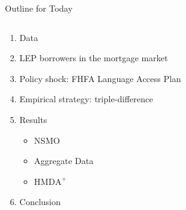 \documentclass[aspectratio=169,11pt]{beamer}
\begin{document}
\begin{frame}{Outline for Today}
\begin{columns}[T] %
\begin{column}{.65\textwidth}
    \begin{enumerate}
        \item Data
        \item LEP borrowers in the mortgage market
        \item Policy shock: FHFA Language Access Plan
        \item Empirical strategy: triple-difference
        \item Results
        \begin{itemize}
            \item NSMO
            \item Aggregate Data
            \item $\text{HMDA}^+$
        \end{itemize}
        \item Conclusion
    \end{enumerate}
\end{column}
\begin{column}{.35\textwidth}
\end{column}
\end{columns}
\end{frame}
\end{document}
